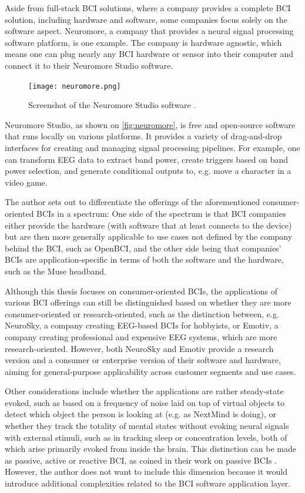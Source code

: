 Aside from full-stack BCI solutions, where a company provides a complete BCI solution, including hardware and software, some companies focus solely on the software aspect. Neuromore, a company that provides a neural signal processing software platform, is one example. The company is hardware agnostic, which means one can plug nearly any BCI hardware or sensor into their computer and connect it to their Neuromore Studio software.

\begin{figure}[ht]
  \centering
  \texttt{[image: neuromore.png]}
  \caption[Screenshot of the Neuromore Studio software ]{Screenshot of the Neuromore Studio software \citep{neuromore_neuromore_nodate}.}
  \label{fig:neuromore}
\end{figure}

Neuromore Studio, as shown on \autoref{fig:neuromore}, is free and open-source software that runs locally on various platforms. It provides a variety of drag-and-drop interfaces for creating and managing signal processing pipelines. For example, one can transform EEG data to extract band power, create triggers based on band power selection, and generate conditional outputs to, e.g. move a character in a video game.

The author sets out to differentiate the offerings of the aforementioned consumer-oriented BCIs in a spectrum: One side of the spectrum is that BCI companies either provide the hardware (with software that at least connects to the device) but are then more generally applicable to use cases not defined by the company behind the BCI, such as OpenBCI, and the other side being that companies' BCIs are application-specific in terms of both the software and the hardware, such as the Muse headband.

Although this thesis focuses on consumer-oriented BCIs, the applications of various BCI offerings can still be distinguished based on whether they are more consumer-oriented or research-oriented, such as the distinction between, e.g. NeuroSky, a company creating EEG-based BCIs for hobbyists, or Emotiv, a company creating professional and expensive EEG systems, which are more research-oriented. However, both NeuroSky and Emotiv provide a research version and a consumer or enterprise version of their software and hardware, aiming for general-purpose applicability across customer segments and use cases.

Other considerations include whether the applications are rather steady-state evoked, such as based on a frequency of noise laid on top of virtual objects to detect which object the person is looking at (e.g. as NextMind is doing), or whether they track the totality of mental states without evoking neural signals with external stimuli, such as in tracking sleep or concentration levels, both of which arise primarily evoked from inside the brain. This distinction can be made as passive, active or reactive BCI, as \citeauthor{alimardani_passive_2020} coined in their work on passive BCIs \citep{alimardani_passive_2020}. However, the author does not want to include this dimension because it would introduce additional complexities related to the BCI software application layer.

